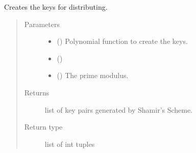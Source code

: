\documentclass[letterpaper,10pt,english]{sphinxmanual}
\begin{document}

\begin{fulllineitems}
\label{\detokenize{index:Toolkit.generate_keys}}
Creates the keys for distributing.
\begin{quote}\begin{description}
\item[{Parameters}] \leavevmode\begin{itemize}
\item {} 
 ({\hyperref[\detokenize{index:Toolkit.Polynomial}]{}}) \textendash{} Polynomial function to create the keys.

\item {} 
 () \textendash{} 

\item {} 
 () \textendash{} The prime modulus.

\end{itemize}

\item[{Returns}] \leavevmode
list of key pairs generated by Shamir’s Scheme.

\item[{Return type}] \leavevmode
list of int tuples

\end{description}\end{quote}

\end{fulllineitems}

\end{document}

